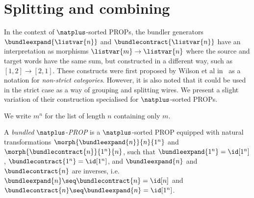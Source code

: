 \section{Splitting and combining}

In the context of \(\natplus\)-sorted PROPs, the bundler generators
\(\bundleexpand{\listvar{n}}\) and \(\bundlecontract{\listvar{n}}\) have an
interpretation as morphisms
\(\listvar{m} \to \listvar{n}\) where the source and target words have the
same sum, but constructed in a different way, such as \([1,2] \to [2,1]\).
These constructs were first proposed by Wilson et al in~\cite{wilson2023string}
as a notation for \emph{non-strict categories}.
However, it is also noted that it could be used in the strict case as a way of
grouping and splitting wires.
We present a slight variation of their construction specialised for
\(\natplus\)-sorted PROPs.

\begin{notation}
    We write \(m^n\) for the list of length \(n\) containing only \(m\).
\end{notation}

\begin{definition}
    A \emph{bundled} \(\natplus\)-\emph{PROP} is a \(\natplus\)-sorted PROP
    equipped with natural transformations \(
        \morph{\bundleexpand{n}}{n}{1^n}
    \) and \(
        \morph{\bundlecontract{n}}{1^n}{n}
    \), such that \(\bundleexpand{1^n} = \id[1^n]\), \(\bundlecontract{1^n} = \id[1^n]\),
    and \(\bundleexpand{n}\) and \(\bundlecontract{n}\) are inverses,
    i.e.\ \(
        \bundleexpand{n} \seq \bundlecontract{n} = \id[n]
    \) and \(
        \bundlecontract{n} \seq \bundleexpand{n} = \id[1^n]
    \).
\end{definition}
